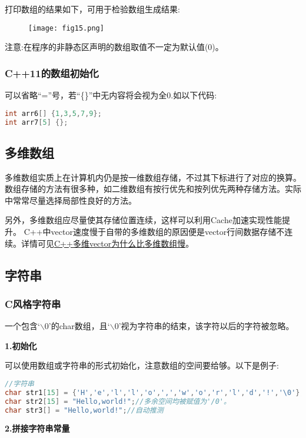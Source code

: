 \documentclass{article}
\begin{document}
    打印数组的结果如下，可用于检验数组生成结果:
    \begin{figure}[H]
        \centering
        \texttt{[image: fig15.png]}
    \end{figure}
    注意:在程序的非静态区声明的数组取值不一定为默认值(0)。

    \subsubsection{C++11的数组初始化}
    可以省略``=''号，若``\{\}''中无内容将会视为全0.如以下代码:
    \begin{lstlisting}[language=c++]
int arr6[] {1,3,5,7,9};
int arr7[5] {};
    \end{lstlisting}

    \subsection{多维数组}
    多维数组实质上在计算机内仍是按一维数组存储，不过其下标进行了对应的换算。
    数组存储的方法有很多种，如二维数组有按行优先和按列优先两种存储方法。实际中常常尽量选择局部性良好的方法。

    另外，多维数组应尽量使其存储位置连续，这样可以利用Cache加速实现性能提升。
    C++中vector速度慢于自带的多维数组的原因便是vector行间数据存储不连续。详情可见\href{https://blog.csdn.net/qq_42080098/article/details/124357242}{C++多维vector为什么比多维数组慢}。
    
    \subsection{字符串}
    \subsubsection{C风格字符串}
    一个包含`$\backslash$0'的char数组，且`$\backslash$0'视为字符串的结束，该字符以后的字符被忽略。

    \textbf{1.初始化}

    可以使用数组或字符串的形式初始化，注意数组的空间要给够。以下是例子:
    \begin{lstlisting}[language=c++]
//字符串
char str1[15] = {'H','e','l','l','o',',','w','o','r','l','d','!','\0'};//末尾'\0'不可省略。
char str2[15] = "Hello,world!";//多余空间均被赋值为'/0'。
char str3[] = "Hello,world!";//自动推测
    \end{lstlisting}

    \textbf{2.拼接字符串常量}
    
\end{document}
